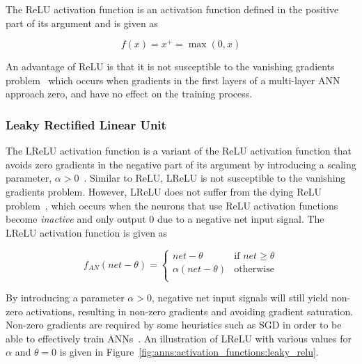 The \acf{ReLU} activation function is an activation function defined in the positive part of its argument and is given as

\begin{equation}
      f(x) = x^{+} = \max(0,x)
      \label{eq:relu}
\end{equation}

An advantage of \acs{ReLU} is that it is not susceptible to the vanishing gradients problem~\cite{ref:xu:2015} which occurs when gradients in the first layers of a multi-layer \acs{ANN} approach zero, and have no effect on the training process.


\subsubsection{Leaky Rectified Linear Unit}\label{sec:anns:an:act_functions:leaky_relu}

The \acf{LReLU} activation function is a variant of the \acs{ReLU} activation function that avoids zero gradients in the negative part of its argument by introducing a scaling parameter, $\alpha > 0$~\cite{ref:xu:2015}. Similar to \acs{ReLU}, \acs{LReLU} is not susceptible to the vanishing gradients problem. However, \acs{LReLU} does not suffer from the dying \acs{ReLU} problem~\cite{ref:trottier:2017}, which occurs when the neurons that use \acs{ReLU} activation functions become \textit{inactive} and only output $0$ due to a negative net input signal. The \acs{LReLU} activation function is given as

\begin{equation}
      f_{AN}(net - \theta) =
      \begin{cases}
            net - \theta         & \text{if $net \geq \theta $} \\
            \alpha(net - \theta) & \text{otherwise}             \\
      \end{cases}
      \label{eq:leaky_relu}
\end{equation}

By introducing a parameter $\alpha > 0$, negative net input signals will still yield non-zero activations, resulting in non-zero gradients and avoiding gradient saturation. Non-zero gradients are required by some heuristics such as \acs{SGD} in order to be able to effectively train \acp{ANN}~\cite{ref:hanin:2018}. An illustration of \acs{LReLU} with various values for $\alpha$ and $\theta = 0$ is given in Figure~\ref{fig:anns:activation_functions:leaky_relu}.

